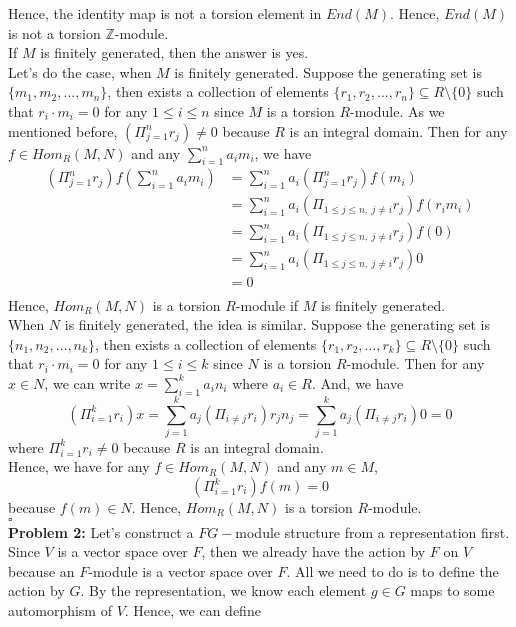 \documentclass[12pt]{amsart}
\newcommand{\Z}{\mathbb{Z}}
\begin{document}
Hence, the identity map is not a torsion element in $End(M)$. Hence, $End(M)$ is not a torsion $\Z$-module.
\\
If $M$ is finitely generated, then the answer is yes.\\
Let's do the case, when $M$ is finitely generated. Suppose the generating set is $\{m_1,m_2,\dots, m_n\}$, then exists a collection of elements $\{r_1,r_2,\dots,r_n\}\subseteq R\setminus\{0\}$ such that $r_i\cdot m_i=0$ for any $1\leq i\leq n$ since $M$ is a torsion $R$-module. As we mentioned before, $(\Pi_{j=1}^nr_j)\neq 0$ because $R$ is an integral domain. Then for any $f\in Hom_R(M,N)$ and any $\sum_{i=1}^n a_im_i$, we have 
\begin{align*}
    (\Pi_{j=1}^nr_j)f(\sum_{i=1}^n a_im_i)&=\sum_{i=1}^n a_i(\Pi_{j=1}^nr_j)f(m_i)\\
    &=\sum_{i=1}^n a_i(\Pi_{1\leq j\leq n, \  j\neq i}r_j)f(r_im_i) \\
    &= \sum_{i=1}^n a_i(\Pi_{1\leq j\leq n, \  j\neq i}r_j)f(0) \\
    &= \sum_{i=1}^n a_i(\Pi_{1\leq j\leq n, \  j\neq i}r_j)0 \\
    &= 0 \\
\end{align*}
Hence, $Hom_R(M,N)$ is a torsion $R$-module if $M$ is finitely generated.\\
When $N$ is finitely generated, the idea is similar. Suppose the generating set is $\{n_1,n_2,\dots, n_k\}$, then exists a collection of elements $\{r_1,r_2,\dots,r_k\}\subseteq R\setminus\{0\}$ such that $r_i\cdot m_i=0$ for any $1\leq i\leq k$ since $N$ is a torsion $R$-module. Then for any $x\in N$, we can write $x=\sum_{i=1}^k a_in_i$ where $a_i\in R$. And, we have 
\[(\Pi_{i=1}^kr_i)x=\sum_{j=1}^ka_j(\Pi_{i\neq j}r_i)r_jn_j=\sum_{j=1}^k a_j(\Pi_{i\neq j}r_i)0=0\]
where $\Pi_{i=1}^kr_i\neq 0$ because $R$ is an integral domain.\\
Hence, we have for any $f\in Hom_R(M,N)$ and any $m\in M$,
\[(\Pi_{i=1}^kr_i)f(m)=0\]
because $f(m)\in N$.
Hence, $Hom_R(M,N)$ is a torsion $R$-module.
\\\phantom{qed}\hfill$\square$\\
\textbf{Problem 2:} Let's construct a $FG-$module structure from a representation first. Since $V$ is a vector space over $F$, then we already have the action by $F$ on $V$ because an $F$-module is a vector space over $F$. All we need to do is to define the action by $G$. By the representation, we know each element $g\in G$ maps to some automorphism of $V$. Hence, we can define
\end{document}
